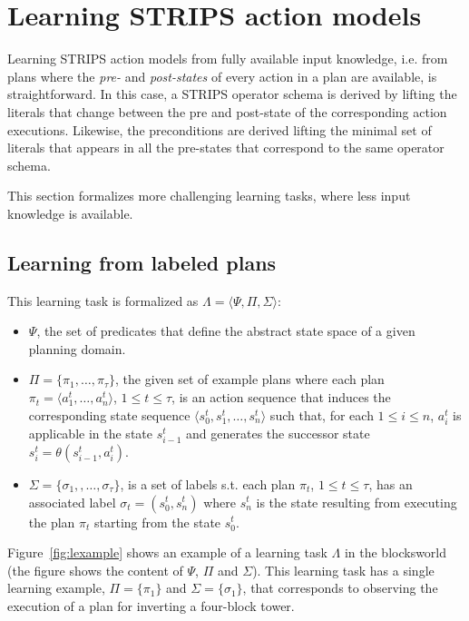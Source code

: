 \documentclass[letterpaper]{article} %
\newcommand{\tup}[1]{{\langle #1 \rangle}}
\begin{document}
\section{Learning STRIPS action models}
Learning STRIPS action models from fully available input knowledge, i.e. from plans where the {\em pre-} and {\em post-states} of every action in a plan are available, is straightforward. In this case, a STRIPS operator schema is derived by lifting the literals that change between the pre and post-state of the corresponding action executions. Likewise, the preconditions are derived lifting the minimal set of literals that appears in all the pre-states that correspond to the same operator schema.

This section formalizes more challenging learning tasks, where less input knowledge is available.

\subsection{Learning from labeled plans}
This learning task is formalized as $\Lambda=\tup{\Psi,\Pi,\Sigma}$:
\begin{itemize}
\item $\Psi$, the set of predicates that define the abstract state space of a given planning domain.
\item $\Pi=\{\pi_1,\ldots,\pi_{\tau}\}$, the given set of example plans where each plan $\pi_t=\tup{a_1^t, \ldots, a_n^t}$, {\small $1\leq t\leq \tau$}, is an action sequence that induces the corresponding state sequence $\tup{s_0^t, s_1^t, \ldots, s_n^t}$ such that, for each {\small $1\leq i\leq n$}, $a_i^t$ is applicable in the state $s_{i-1}^t$ and generates the successor state $s_i^t=\theta(s_{i-1}^t,a_i^t)$.
\item $\Sigma=\{\sigma_1,,\ldots,\sigma_{\tau}\}$, is a set of labels s.t. each plan $\pi_t$, {\small $1\leq t\leq \tau$}, has an associated label $\sigma_t=(s_0^t,s_{n}^t)$ where $s_{n}^t$ is the state resulting from executing the plan $\pi_t$ starting from the state $s_0^t$.
\end{itemize}

Figure~\ref{fig:lexample} shows an example of a learning task $\Lambda$ in the blocksworld (the figure shows the content of $\Psi$, $\Pi$ and $\Sigma$). This learning task has a single learning example, $\Pi=\{\pi_1\}$ and $\Sigma=\{\sigma_1\}$, that corresponds to observing the execution of a plan for inverting a four-block tower.
\end{document}
